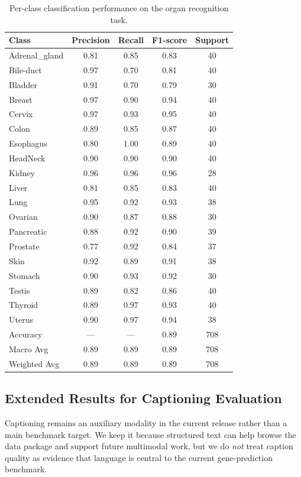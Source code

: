 \documentclass{article}
\begin{document}
\begin{table}[t]
\centering
\scriptsize
\setlength{\tabcolsep}{6pt}
\begin{tabular}{lcccc}
\toprule
\textbf{Class} & \textbf{Precision} & \textbf{Recall} & \textbf{F1-score} & \textbf{Support} \\
\midrule
Adrenal\_gland & 0.81 & 0.85 & 0.83 & 40 \\
Bile-duct      & 0.97 & 0.70 & 0.81 & 40 \\
Bladder        & 0.91 & 0.70 & 0.79 & 30 \\
Breast         & 0.97 & 0.90 & 0.94 & 40 \\
Cervix         & 0.97 & 0.93 & 0.95 & 40 \\
Colon          & 0.89 & 0.85 & 0.87 & 40 \\
Esophagus      & 0.80 & 1.00 & 0.89 & 40 \\
HeadNeck       & 0.90 & 0.90 & 0.90 & 40 \\
Kidney         & 0.96 & 0.96 & 0.96 & 28 \\
Liver          & 0.81 & 0.85 & 0.83 & 40 \\
Lung           & 0.95 & 0.92 & 0.93 & 38 \\
Ovarian        & 0.90 & 0.87 & 0.88 & 30 \\
Pancreatic     & 0.88 & 0.92 & 0.90 & 39 \\
Prostate       & 0.77 & 0.92 & 0.84 & 37 \\
Skin           & 0.92 & 0.89 & 0.91 & 38 \\
Stomach        & 0.90 & 0.93 & 0.92 & 30 \\
Testis         & 0.89 & 0.82 & 0.86 & 40 \\
Thyroid        & 0.89 & 0.97 & 0.93 & 40 \\
Uterus         & 0.90 & 0.97 & 0.94 & 38 \\
\midrule
Accuracy       & ---  & ---  & 0.89 & 708 \\
Macro Avg      & 0.89 & 0.89 & 0.89 & 708 \\
Weighted Avg   & 0.89 & 0.89 & 0.89 & 708 \\
\bottomrule
\end{tabular}
\caption{Per-class classification performance on the organ recognition task.}
\label{tab:organ_classification}
\end{table}

\subsection{Extended Results for Captioning Evaluation}
\noindent
Captioning remains an auxiliary modality in the current release rather than a main benchmark target. We keep it because structured text can help browse the data package and support future multimodal work, but we do \emph{not} treat caption quality as evidence that language is central to the current gene-prediction benchmark.
\end{document}
